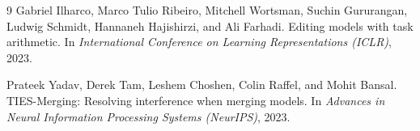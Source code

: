\documentclass[10pt,twocolumn]{article}
\begin{document}
\begin{thebibliography}{9}
\footnotesize
{}
Gabriel Ilharco, Marco Tulio Ribeiro, Mitchell Wortsman, Suchin Gururangan, Ludwig Schmidt, Hannaneh Hajishirzi, and Ali Farhadi. Editing models with task arithmetic. In \emph{International Conference on Learning Representations (ICLR)}, 2023.

Prateek Yadav, Derek Tam, Leshem Choshen, Colin Raffel, and Mohit Bansal. TIES-Merging: Resolving interference when merging models. In \emph{Advances in Neural Information Processing Systems (NeurIPS)}, 2023.
\end{thebibliography}
\end{document}
